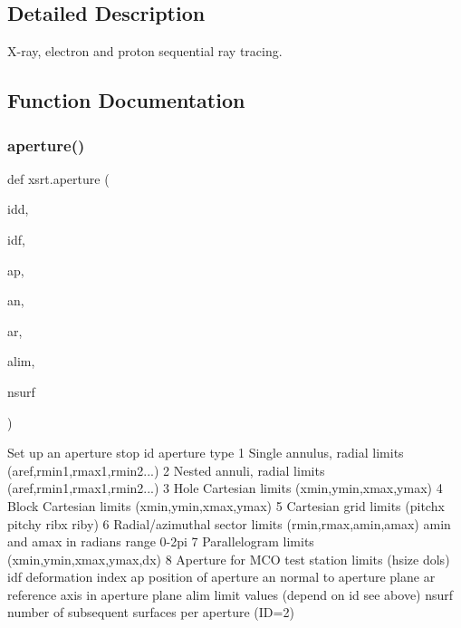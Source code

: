\subsection{Detailed Description}
X-\/ray, electron and proton sequential ray tracing. 

\subsection{Function Documentation}
\mbox{\label{namespacexsrt_ab18cc347797a7afd2536b53c56f0036a}} 
\subsubsection{\texorpdfstring{aperture()}{aperture()}}
{\footnotesize\ttfamily def xsrt.\+aperture (\begin{DoxyParamCaption}\item[{}]{idd,  }\item[{}]{idf,  }\item[{}]{ap,  }\item[{}]{an,  }\item[{}]{ar,  }\item[{}]{alim,  }\item[{}]{nsurf }\end{DoxyParamCaption})}

\begin{DoxyVerb}Set up an aperture stop
    id         aperture type
                1 Single annulus, radial limits (aref,rmin1,rmax1,rmin2...)
                2 Nested annuli, radial limits  (aref,rmin1,rmax1,rmin2...)
                3 Hole Cartesian limits (xmin,ymin,xmax,ymax)
                4 Block Cartesian limits (xmin,ymin,xmax,ymax)
                5 Cartesian grid limits (pitchx pitchy ribx riby)
                6 Radial/azimuthal sector limits (rmin,rmax,amin,amax)
                 amin and amax in radians range 0-2pi
                7 Parallelogram limits (xmin,ymin,xmax,ymax,dx)
                8 Aperture for MCO test station limits (hsize dols)
    idf        deformation index
    ap         position of aperture
    an         normal to aperture plane
    ar         reference axis in aperture plane
    alim       limit values (depend on id see above)
    nsurf      number of subsequent surfaces per aperture (ID=2)
\end{DoxyVerb}
 \mbox{\label{namespacexsrt_a57358b4b808cd71955e361572d259375}} 

